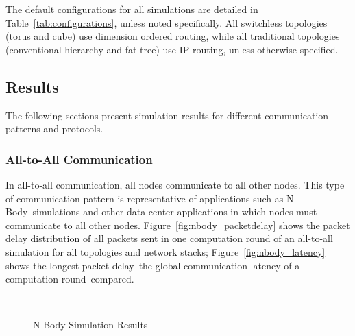 The default configurations for all simulations are detailed in Table~\ref{tab:configurations}, unless noted specifically.  All switchless topologies (torus and cube) use dimension ordered routing, while all traditional topologies (conventional hierarchy and fat-tree) use IP routing, unless otherwise specified.

\subsection {Results}

The following sections present simulation results for different communication patterns and protocols.


\subsubsection{All-to-All Communication}
\newcommand{\nbody}{N-Body}
In all-to-all communication, all nodes communicate to all other nodes.  This type of communication pattern is representative of applications such as \nbody~simulations and other data center applications in which nodes must communicate to all other nodes. Figure~\ref{fig:nbody_packetdelay} shows the packet delay distribution of all packets sent in one computation round of an all-to-all simulation for all topologies and network stacks; Figure~\ref{fig:nbody_latency} shows the longest packet delay--the global communication latency of a computation round--compared.

\captionsetup[subfloat]{captionskip=-0.003in}
\begin{figure}
    \centering
    \\
    \vspace{-0.1in}
    \vspace{-0.07in}
    \caption{N-Body Simulation Results}
    \vspace{-0.1in}
    \label{fig:common_topos}
\end{figure}

